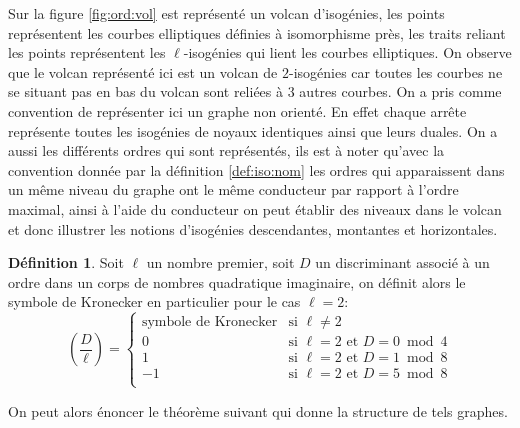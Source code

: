 \documentclass[10pt,a4paper]{book}
\theoremstyle{plain}
\theoremstyle{definition}
\theoremstyle{definition}
\theoremstyle{definition}
\theoremstyle{definition}
\theoremstyle{definition}
\newtheorem{defi}[thm]{Définition}
\theoremstyle{remark}
\theoremstyle{remark}
\theoremstyle{definition}
\begin{document}
Sur la figure \ref{fig:ord:vol} est représenté un volcan d'isogénies, les 
points représentent les courbes elliptiques définies à isomorphisme près, les 
traits reliant les points représentent les $\ell$-isogénies qui lient les 
courbes elliptiques. On observe que le volcan représenté ici est un volcan de 
$2$-isogénies car toutes les courbes ne se situant pas en bas du volcan sont 
reliées à $3$ autres courbes. On a pris comme convention de représenter ici un
graphe non orienté. En effet chaque arrête représente toutes les isogénies de 
noyaux identiques ainsi que leurs duales. On a aussi les différents ordres qui
sont représentés, ils est à noter qu'avec la convention donnée par la définition
\ref{def:iso:nom} les ordres qui apparaissent dans un même niveau du graphe ont
le même conducteur par rapport à l'ordre maximal, ainsi à l'aide du conducteur 
on peut établir des niveaux dans le volcan et donc illustrer les notions 
d'isogénies descendantes, montantes et horizontales. 

\begin{defi}
Soit $\ell$ un nombre premier, soit $D$ un discriminant associé à un ordre dans
un corps de nombres quadratique imaginaire, on définit alors le symbole de 
Kronecker en  particulier pour le cas $\ell=2$:
\begin{equation*}
\left( \frac{D}{\ell} \right)= \begin{cases}
  \text{symbole de Kronecker} & \text{si } \ell\neq 2 \\
0 & \text{si } \ell=2 \text{ et } D=0 \bmod 4 \\
1 & \text{si } \ell=2 \text{ et } D=1 \bmod 8 \\
-1 & \text{si } \ell=2 \text{ et } D=5 \bmod 8 \\
\end{cases}
\end{equation*}
\end{defi}

On peut alors énoncer le théorème suivant qui donne la structure de tels 
graphes.
\end{document}
